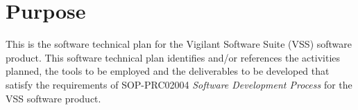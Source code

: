 \section{Purpose}
{This is the software technical plan for the Vigilant Software Suite (VSS) software product. This software technical plan identifies and/or references the activities planned, the tools to be employed and the deliverables to be developed that satisfy the requirements of SOP-PRC02004 \textit{Software Development Process} for the VSS software product.}
